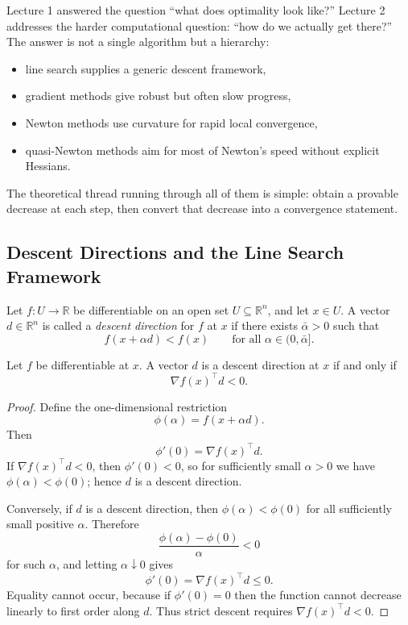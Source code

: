 \label{lec:l2}

\begin{intuition}
	Lecture 1 answered the question ``what does optimality look like?'' Lecture 2 addresses the harder computational question: ``how do we actually get there?'' The answer is not a single algorithm but a hierarchy:
	\begin{itemize}
		\item line search supplies a generic descent framework,
		\item gradient methods give robust but often slow progress,
		\item Newton methods use curvature for rapid local convergence,
		\item quasi-Newton methods aim for most of Newton's speed without explicit Hessians.
	\end{itemize}
	The theoretical thread running through all of them is simple: obtain a provable decrease at each step, then convert that decrease into a convergence statement.
\end{intuition}

\subsection{Descent Directions and the Line Search Framework}
\label{sec:l2-descent-directions-and-the-line-search-framework}

\begin{definition}\label{def:l2-descent-direction}
	Let $f:U \to \mathbb{R}$ be differentiable on an open set $U \subseteq \mathbb{R}^n$, and let $x \in U$. A vector $d \in \mathbb{R}^n$ is called a \emph{descent direction} for $f$ at $x$ if there exists $\bar\alpha>0$ such that
	\[
		f(x+\alpha d) < f(x)
		\qquad \text{for all } \alpha \in (0,\bar\alpha].
	\]
\end{definition}

\begin{proposition}\label{prop:l2-characterization-of-descent-directions}
	Let $f$ be differentiable at $x$. A vector $d$ is a descent direction at $x$ if and only if
	\[
		\nabla f(x)^\top d < 0.
	\]
\end{proposition}
\begin{proof}
	Define the one-dimensional restriction
	\[
		\phi(\alpha)=f(x+\alpha d).
	\]
	Then
	\[
		\phi'(0)=\nabla f(x)^\top d.
	\]
	If $\nabla f(x)^\top d<0$, then $\phi'(0)<0$, so for sufficiently small $\alpha>0$ we have $\phi(\alpha)<\phi(0)$; hence $d$ is a descent direction.

	Conversely, if $d$ is a descent direction, then $\phi(\alpha)<\phi(0)$ for all sufficiently small positive $\alpha$. Therefore
	\[
		\frac{\phi(\alpha)-\phi(0)}{\alpha}<0
	\]
	for such $\alpha$, and letting $\alpha \downarrow 0$ gives
	\[
		\phi'(0)=\nabla f(x)^\top d \le 0.
	\]
	Equality cannot occur, because if $\phi'(0)=0$ then the function cannot decrease linearly to first order along $d$. Thus strict descent requires $\nabla f(x)^\top d<0$.
\end{proof}

